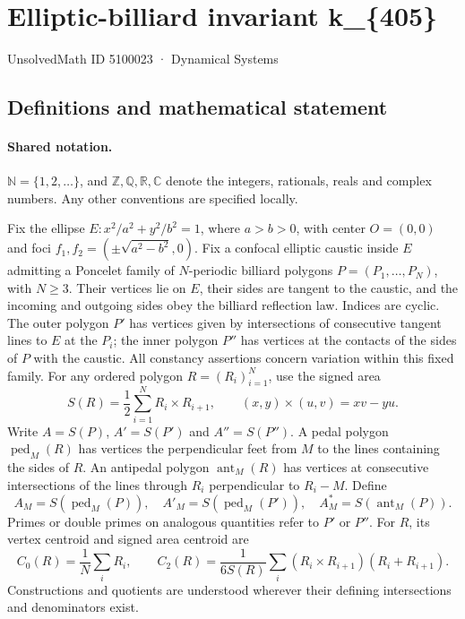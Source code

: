 \documentclass[11pt]{article}
\begin{document}
\setcounter{section}{5100022}
\section{Elliptic-billiard invariant k\_\{405\}}\label{5100023}
{\small\sffamily UnsolvedMath ID 5100023 · Dynamical Systems}
\subsection{Definitions and mathematical statement}

\paragraph{Shared notation.}$\mathbb N=\{1,2,\ldots\}$, and $\mathbb Z,\mathbb Q,\mathbb R,\mathbb C$ denote the integers, rationals, reals and complex numbers. Any other conventions are specified locally.


Fix the ellipse $E:x^2/a^2+y^2/b^2=1$, where $a>b>0$, with center $O=(0,0)$ and foci $f_1,f_2=(\pm\sqrt{a^2-b^2},0)$. Fix a confocal elliptic caustic inside $E$ admitting a Poncelet family of $N$-periodic billiard polygons $P=(P_1,\ldots,P_N)$, with $N\geq3$. Their vertices lie on $E$, their sides are tangent to the caustic, and the incoming and outgoing sides obey the billiard reflection law. Indices are cyclic. The outer polygon $P'$ has vertices given by intersections of consecutive tangent lines to $E$ at the $P_i$; the inner polygon $P''$ has vertices at the contacts of the sides of $P$ with the caustic. All constancy assertions concern variation within this fixed family.
For any ordered polygon $R=(R_i)_{i=1}^N$, use the signed area
\[S(R)=\frac12\sum_{i=1}^N R_i\times R_{i+1},\qquad (x,y)\times(u,v)=xv-yu.\]
Write $A=S(P)$, $A'=S(P')$ and $A''=S(P'')$. A pedal polygon $\operatorname{ped}_M(R)$ has vertices the perpendicular feet from $M$ to the lines containing the sides of $R$. An antipedal polygon $\operatorname{ant}_M(R)$ has vertices at consecutive intersections of the lines through $R_i$ perpendicular to $R_i-M$. Define
\[A_M=S(\operatorname{ped}_M(P)),\quad A'_M=S(\operatorname{ped}_M(P')),\quad A_M^*=S(\operatorname{ant}_M(P)).\]
Primes or double primes on analogous quantities refer to $P'$ or $P''$. For $R$, its vertex centroid and signed area centroid are
\[C_0(R)=\frac1N\sum_i R_i,\qquad C_2(R)=\frac{1}{6S(R)}\sum_i(R_i\times R_{i+1})(R_i+R_{i+1}).\]
Constructions and quotients are understood wherever their defining intersections and denominators exist.
\end{document}
